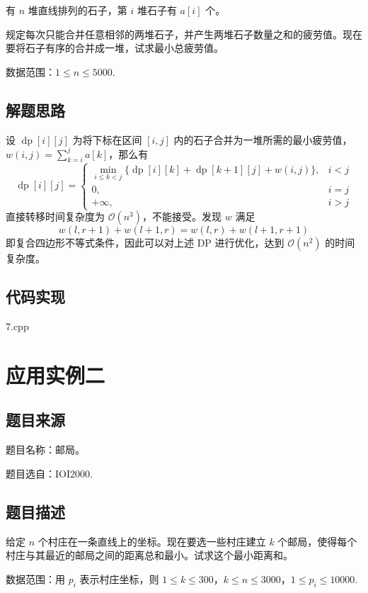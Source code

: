有 \(n\) 堆直线排列的石子，第 \(i\) 堆石子有 \(a[i]\) 个。

规定每次只能合并任意相邻的两堆石子，并产生两堆石子数量之和的疲劳值。现在要将石子有序的合并成一堆，试求最小总疲劳值。

数据范围：\(1\le n\le 5000\).

\subsection{解题思路}

设 \(\operatorname{dp}[i][j]\) 为将下标在区间 \([i,j]\)
内的石子合并为一堆所需的最小疲劳值，\(w(i,j)=\sum_{k=i}^ja[k]\)，那么有
\[
\operatorname{dp}[i][j]=
\left\{
\begin{array}{ll}
\min\limits_{i\le k < j}\{\operatorname{dp}[i][k]+\operatorname{dp}[k+1][j]+w(i,j)\},&i < j\\
0,&i=j\\
+\infty, &i>j
\end{array}
\right.
\] 直接转移时间复杂度为 \(\mathcal{O}(n^3)\)，不能接受。发现 \(w\) 满足
\[
w(l,r+1)+w(l+1,r)=w(l,r)+w(l+1,r+1)
\] 即复合四边形不等式条件，因此可以对上述 DP 进行优化，达到
\(\mathcal{O}(n^2)\) 的时间复杂度。

\subsection{代码实现}

7.cpp

\section{应用实例二}

\subsection{题目来源}

题目名称：邮局。

题目选自：IOI2000.

\subsection{题目描述}

给定 \(n\) 个村庄在一条直线上的坐标。现在要选一些村庄建立 \(k\)
个邮局，使得每个村庄与其最近的邮局之间的距离总和最小。试求这个最小距离和。

数据范围：用 \(p_i\) 表示村庄坐标，则
\(1\le k\le 300\)，\(k\le n\le 3000\)，\(1 \le p_i\le 10000\).

